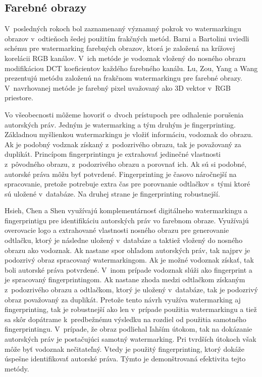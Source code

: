 \subsection{Farebné obrazy}
V~posledných rokoch bol zaznamenaný významný pokrok vo watermarkingu obrazov v~odtieňoch šedej použitím frakčných metód. Barni a Bartolini \cite{Barni} uviedli schému pre watermarking farebných obrazov, ktorá je založená na krížovej korelácii RGB kanálov. V~ich metóde je vodoznak vložený do nosného obrazu modifikáciou DCT koeficientov každého farebného kanálu. Lu, Zou, Yang a Wang \cite{Lu-fractal} prezentujú metódu založenú na frakčnom watermarkingu pre farebné obrazy. V~navrhovanej metóde je farebný pixel uvažovaný ako 3D vektor v~RGB priestore.

Vo všeobecnosti môžeme hovoriť o~dvoch prístupoch pre odhalenie porušenia autorských práv. Jedným je watermarking a tým druhým je fingerprinting. Základnou myšlienkou watermarkingu je vložiť informáciu, vodoznak do obrazu. Ak je podobný vodznak získaný z~podozrivého obrazu, tak je považovaný za duplikát. Princípom fingerprintingu je extrahovať jedinečné vlastnosti z~pôvodného obrazu, z~podozrivého obrazu a porovnať ich. Ak sú si podobné, autorské práva môžu byť potvrdené. Fingerprinting je časovo náročnejší na spracovanie, pretože potrebuje extra čas pre porovnanie odtlačkov s~tými ktoré sú uložené v~databáze. Na druhej strane je fingerprinting robustnejší. \cite{Hsieh2014}

Hsieh, Chen a Shen \cite{Hsieh2014} využívajú komplementárnosť digitálneho watermarkingu a fingerprintigu pre identifikáciu autorských práv vo farebnom obraze. Využívajú overovacie logo a extrahované vlastnosti nosného obrazu pre generovanie odtlačku, ktorý je následne uložený v~databáze a taktiež vložený do nosného obrazu ako vodoznak. Ak nastane spor ohľadom autorských práv, tak najprv je podozrivý obraz spracovaný watermarkingom. Ak je možné vodoznak získať, tak boli autorské práva potvrdené. V~inom prípade vodoznak slúži ako fingerprint a je spracovaný fingerprintingom. Ak nastane zhoda medzi odtlačkom získaným z~podozrivého obrazu a odtlačkom, ktorý je uložený v~databáze, tak je podozrivý obraz považovaný za duplikát. Pretože tento návrh využíva watermarking aj fingerprinting, tak je robustnejší ako len v~prípade použitia watermarkingu a tiež sa skôr dopátrame k~predbežnému výsledku na rozdiel od použitia samotného fingerprintingu. V~prípade, že obraz podliehal ľahším útokom, tak na dokázanie autorských práv je postačujúci samotný watermarking. Pri tvrdších útokoch však môže byť vodoznak nečitateľný. Vtedy je použitý fingerprinting, ktorý dokáže úspešne identifikovať autorské práva. Týmto je demonštrovaná efektivita tejto metódy.


